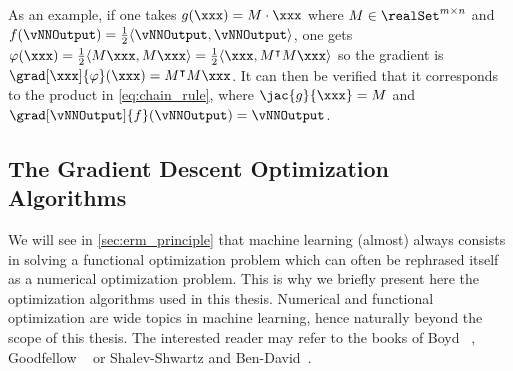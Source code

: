 As an example, if one takes \(g(\xxx) = M \cdot \xxx\) where \(M \in \realSet^{m \times n}\) and \(f(\vNNOutput) = \frac{1}{2}\langle \vNNOutput, \vNNOutput \rangle\), one gets \(\varphi(\xxx) = \frac{1}{2} \langle M\xxx, M\xxx \rangle = \frac{1}{2} \langle \xxx, M^\intercal M \xxx \rangle\) so the gradient is \(\grad[\xxx]{\varphi}(\xxx) = M^\intercal M \xxx\).
It can then be verified that it corresponds to the product in \autoref{eq:chain_rule}, where \(\jac{g}{\xxx} = M\) and \(\grad[\vNNOutput]{f}(\vNNOutput) = \vNNOutput\).


\subsection{The Gradient Descent Optimization Algorithms}
\label{sec:optim_algo}
We will see in \autoref{sec:erm_principle} that machine learning (almost) always consists in solving a functional optimization problem which can often be rephrased itself as a numerical optimization problem.
This is why we briefly present here the optimization algorithms used in this thesis.
Numerical and functional optimization are wide topics in machine learning, hence naturally beyond the scope of this thesis.
The interested reader may refer to the books of Boyd \etal{}~\cite{boyd_convex_2004}, Goodfellow \etal{}~\cite[Chap.~8]{goodfellow_deep_2017} or Shalev-Shwartz and Ben-David~\cite[Chap.~14]{shalev-shwartz_understanding_2014}.

